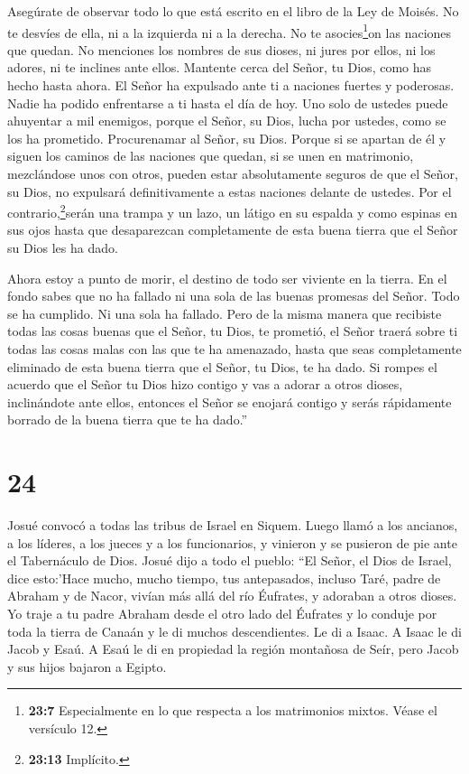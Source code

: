 Asegúrate de observar todo lo que está escrito en el libro
de la Ley de Moisés. No te desvíes de ella, ni a la izquierda ni a la
derecha.  No te asocies\footnote{\textbf{23:7} Especialmente
  en lo que respecta a los matrimonios mixtos. Véase el versículo 12.}on
las naciones que quedan. No menciones los nombres de sus dioses, ni
jures por ellos, ni los adores, ni te inclines ante ellos. 
Mantente cerca del Señor, tu Dios, como has hecho hasta ahora.
 El Señor ha expulsado ante ti a naciones fuertes y
poderosas. Nadie ha podido enfrentarse a ti hasta el día de hoy.
 Uno solo de ustedes puede ahuyentar a mil enemigos, porque
el Señor, su Dios, lucha por ustedes, como se los ha prometido.
 Procurenamar al Señor, su Dios.  Porque si se
apartan de él y siguen los caminos de las naciones que quedan, si se
unen en matrimonio, mezclándose unos con otros,  pueden
estar absolutamente seguros de que el Señor, su Dios, no expulsará
definitivamente a estas naciones delante de ustedes. Por el
contrario,\footnote{\textbf{23:13} Implícito.}serán una trampa y un
lazo, un látigo en su espalda y como espinas en sus ojos hasta que
desaparezcan completamente de esta buena tierra que el Señor su Dios les
ha dado.

 Ahora estoy a punto de morir, el destino de todo ser
viviente en la tierra. En el fondo sabes que no ha fallado ni una sola
de las buenas promesas del Señor. Todo se ha cumplido. Ni una sola ha
fallado.  Pero de la misma manera que recibiste todas las
cosas buenas que el Señor, tu Dios, te prometió, el Señor traerá sobre
ti todas las cosas malas con las que te ha amenazado, hasta que seas
completamente eliminado de esta buena tierra que el Señor, tu Dios, te
ha dado.  Si rompes el acuerdo que el Señor tu Dios hizo
contigo y vas a adorar a otros dioses, inclinándote ante ellos, entonces
el Señor se enojará contigo y serás rápidamente borrado de la buena
tierra que te ha dado.''

\hypertarget{section-23}{%
\section{24}\label{section-23}}

 Josué convocó a todas las tribus de Israel en Siquem. Luego
llamó a los ancianos, a los líderes, a los jueces y a los funcionarios,
y vinieron y se pusieron de pie ante el Tabernáculo de Dios.
 Josué dijo a todo el pueblo: ``El Señor, el Dios de Israel,
dice esto:'Hace mucho, mucho tiempo, tus antepasados, incluso Taré,
padre de Abraham y de Nacor, vivían más allá del río Éufrates, y
adoraban a otros dioses.  Yo traje a tu padre Abraham desde
el otro lado del Éufrates y lo conduje por toda la tierra de Canaán y le
di muchos descendientes. Le di a Isaac.  A Isaac le di Jacob
y Esaú. A Esaú le di en propiedad la región montañosa de Seír, pero
Jacob y sus hijos bajaron a Egipto.

